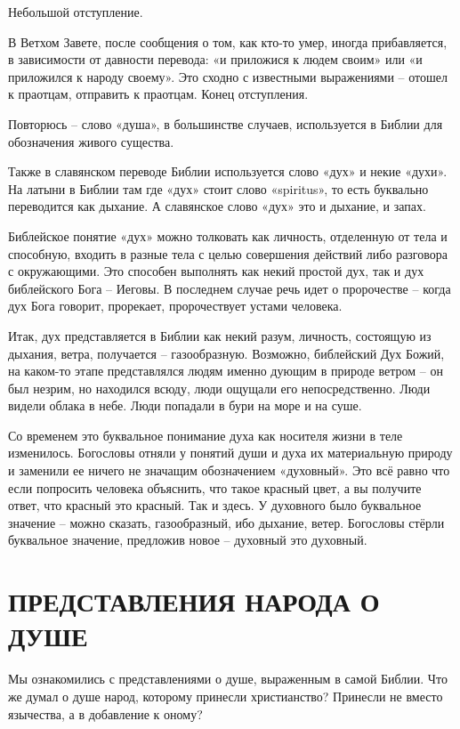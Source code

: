 \documentclass[a5paper,11pt,openany]{article}
\begin{document}
   Небольшой отступление.

   В Ветхом Завете, после сообщения о том, как кто-то умер, иногда прибавляется, в зависимости от давности перевода: «и приложися к людем своим» или «и приложился к народу своему». Это сходно с известными выражениями – отошел к праотцам, отправить к праотцам. Конец отступления.

   Повторюсь – слово «душа», в большинстве случаев, используется в Библии для обозначения живого существа.

   Также в славянском переводе Библии используется слово «дух» и некие «духи». На латыни в Библии там где «дух» стоит слово «spiritus», то есть буквально переводится как дыхание. А славянское слово «дух» это и дыхание, и запах.

   Библейское понятие «дух» можно толковать как личность, отделенную от тела и способную, входить в разные тела с целью совершения действий либо разговора с окружающими. Это способен выполнять как некий простой дух, так и дух библейского Бога – Иеговы. В последнем случае речь идет о пророчестве – когда дух Бога говорит, прорекает, пророчествует устами человека.

   Итак, дух представляется в Библии как некий разум, личность, состоящую из дыхания, ветра, получается – газообразную. Возможно, библейский Дух Божий, на каком-то этапе представлялся людям именно дующим в природе ветром – он был незрим, но находился всюду, люди ощущали его непосредственно. Люди видели облака в небе. Люди попадали в бури на море и на суше.

   Со временем это буквальное понимание духа как носителя жизни в теле изменилось. Богословы отняли у понятий души и духа их материальную природу и заменили ее ничего не значащим обозначением «духовный». Это всё равно что если попросить человека объяснить, что такое красный цвет, а вы получите ответ, что красный это красный. Так и здесь. У духовного было буквальное значение – можно сказать, газообразный, ибо дыхание, ветер. Богословы стёрли буквальное значение, предложив новое – духовный это духовный.
   
\section{ПРЕДСТАВЛЕНИЯ НАРОДА О ДУШЕ}

   Мы ознакомились с представлениями о душе, выраженным в самой Библии. Что же думал о душе народ, которому принесли христианство? Принесли не вместо язычества, а в добавление к оному?
\end{document}
